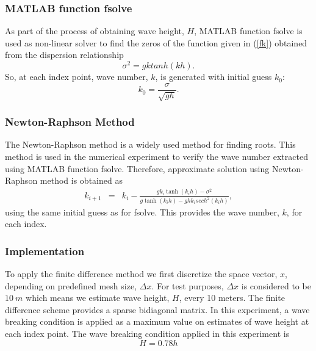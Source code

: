 \subsubsection*{MATLAB function fsolve}
As part of the process of obtaining wave height, $H$, MATLAB function fsolve is used as non-linear solver to find the zeros of the function given in (\ref{fk}) obtained from the dispersion relationship
$$
\sigma^{2}=gk tanh(kh).
$$ 
So, at each index point, wave number, $k$, is generated with initial guess $k_0$:
$$k_0=\frac{\sigma}{\sqrt{gh}}.$$
\subsubsection*{Newton-Raphson Method}
The Newton-Raphson method is a widely used method for finding roots. This method is used in the numerical experiment to verify the wave number extracted using MATLAB function fsolve. Therefore, approximate solution using Newton-Raphson method is obtained as
\begin{eqnarray}
k_{i+1}& =& k_{i}-\frac{gk_i\tanh(k_ih)-\sigma^2}{g\tanh(k_ih)-ghk_i sech^2(k_ih)},
\end{eqnarray}
using the same initial guess as for fsolve.
This provides the wave number, $k$, for each index.

\subsubsection{Implementation}
To apply the finite difference method we first discretize the space vector, ${x}$, depending on predefined mesh size, ${\Delta x}$. For test purposes, ${\Delta x}$ is considered to be ${10~m}$ which means we estimate wave height, $H$, every 10 meters. The finite difference scheme provides a sparse bidiagonal matrix. In this experiment, a wave breaking condition is applied as a maximum value on estimates of wave height at each index point. The wave breaking condition applied in this experiment is
$${H=0.78h}$$

